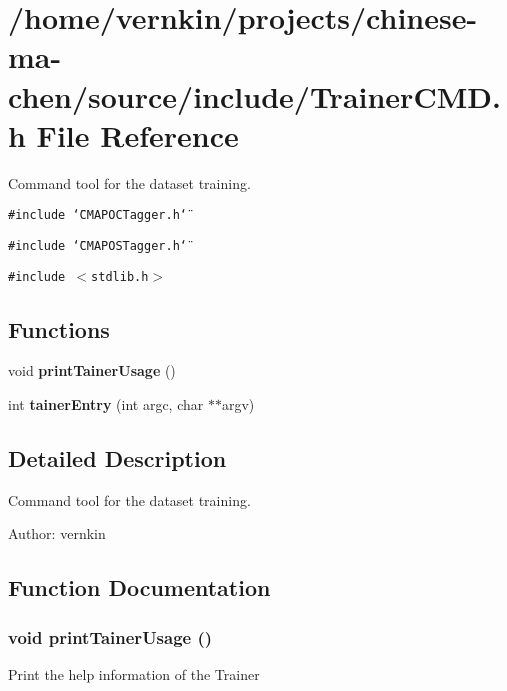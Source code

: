 \section{/home/vernkin/projects/chinese-ma-chen/source/include/TrainerCMD.h File Reference}
\label{TrainerCMD_8h}
Command tool for the dataset training.  


{\tt \#include \char`\"{}CMAPOCTagger.h\char`\"{}}\par
{\tt \#include \char`\"{}CMAPOSTagger.h\char`\"{}}\par
{\tt \#include $<$stdlib.h$>$}\par
\subsection*{Functions}
\begin{CompactItemize}
\item 
void {\bf printTainerUsage} ()
\item 
int {\bf tainerEntry} (int argc, char $\ast$$\ast$argv)
\end{CompactItemize}


\subsection{Detailed Description}
Command tool for the dataset training. 

\begin{Desc}
\item[Author:]vernkin \end{Desc}


\subsection{Function Documentation}
\subsubsection[{printTainerUsage}]{\setlength{\rightskip}{0pt plus 5cm}void printTainerUsage ()}\label{TrainerCMD_8h_cadfbf3ad2e202a3d175a59bac8079a1}


Print the help information of the Trainer 
